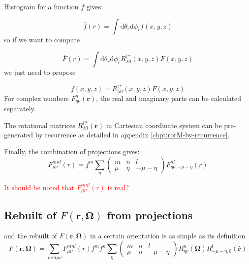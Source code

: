 Histogram for a function $f$ gives:

\begin{equation}
\overline{f}(r)=\int\mathrm{d}\theta_{r}\mathrm{d}\phi_{r}f(x,y,z)
\end{equation}
so if we want to compute

\begin{equation}
\overline{F}(r)=\int\mathrm{d}\theta_{r}\mathrm{d}\phi_{r}R_{\lambda0}^{l*}(x,y,z)F(x,y,z)
\end{equation}
we just need to propose 

\begin{equation}
f(x,y,z)=R_{\lambda0}^{l*}(x,y,z)F(x,y,z)
\end{equation}
For complex numbers $F_{\eta\nu}^{n}(\mathbf{r})$, the real and imaginary
parts can be calculated separately.

The rotational matrices $R_{\lambda0}^{l*}(\mathbf{r})$ in Cartesian
coordinate system can be pre-generated by recurrence as detailed in
appendix \ref{chpt:rotM-by-recurrence}. 

Finally, the combination of projections gives:
\begin{equation}
F_{\mu\nu}^{mnl}(r)=f^{m}\sum_{\eta}\left(\begin{array}{ccc}
m & n & l\\
\mu & \eta & -\mu-\eta
\end{array}\right)F_{\eta\nu,-\mu-\eta}^{nl}(r)
\end{equation}


\textcolor{red}{It should be noted that $F_{\mu\nu}^{mnl}(r)$ is
real?}


\subsection{Rebuilt of $F(\mathbf{r},\mathbf{\Omega})$ from projections}

and the rebuilt of $F(\mathbf{r},\mathbf{\Omega})$ in a certain orientation
is as simple as its definition
\begin{equation}
F(\mathbf{r},\mathbf{\Omega})=\sum_{mnl\mu\nu}F_{\mu\nu}^{mnl}(r)f^{m}f^{n}\sum_{\eta}\left(\begin{array}{ccc}
m & n & l\\
\mu & \eta & -\mu-\eta
\end{array}\right)R_{\eta\nu}^{n}(\mathbf{\Omega})R_{-\mu-\eta,0}^{l}(\mathbf{\hat{r}})\label{eq:bwd-1}
\end{equation}



